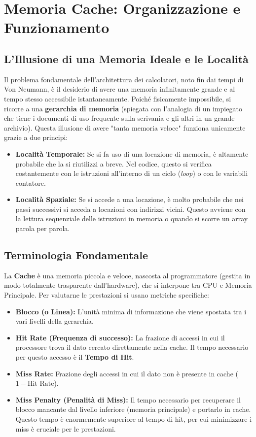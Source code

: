 \documentclass[12pt, a4paper]{article}
\begin{document}
\section{Memoria Cache: Organizzazione e Funzionamento}

\subsection{L'Illusione di una Memoria Ideale e le Località}
Il problema fondamentale dell'architettura dei calcolatori, noto fin dai tempi di Von Neumann, è il desiderio di avere una memoria infinitamente grande e al tempo stesso accessibile istantaneamente. Poiché fisicamente impossibile, si ricorre a una \textbf{gerarchia di memoria} (spiegata con l'analogia di un impiegato che tiene i documenti di uso frequente sulla scrivania e gli altri in un grande archivio).
Questa illusione di avere "tanta memoria veloce" funziona unicamente grazie a due principi:
\begin{itemize}
    \item \textbf{Località Temporale:} Se si fa uso di una locazione di memoria, è altamente probabile che la si riutilizzi a breve. Nel codice, questo si verifica costantemente con le istruzioni all'interno di un ciclo (\textit{loop}) o con le variabili contatore.
    \item \textbf{Località Spaziale:} Se si accede a una locazione, è molto probabile che nei passi successivi si acceda a locazioni con indirizzi vicini. Questo avviene con la lettura sequenziale delle istruzioni in memoria o quando si scorre un array parola per parola.
\end{itemize}

\subsection{Terminologia Fondamentale}
La \textbf{Cache} è una memoria piccola e veloce, nascosta al programmatore (gestita in modo totalmente trasparente dall'hardware), che si interpone tra CPU e Memoria Principale. Per valutarne le prestazioni si usano metriche specifiche:
\begin{itemize}
    \item \textbf{Blocco (o Linea):} L'unità minima di informazione che viene spostata tra i vari livelli della gerarchia.
    \item \textbf{Hit Rate (Frequenza di successo):} La frazione di accessi in cui il processore trova il dato cercato direttamente nella cache. Il tempo necessario per questo accesso è il \textbf{Tempo di Hit}.
    \item \textbf{Miss Rate:} Frazione degli accessi in cui il dato non è presente in cache ($1 - \text{Hit Rate}$).
    \item \textbf{Miss Penalty (Penalità di Miss):} Il tempo necessario per recuperare il blocco mancante dal livello inferiore (memoria principale) e portarlo in cache. Questo tempo è enormemente superiore al tempo di hit, per cui minimizzare i miss è cruciale per le prestazioni.
\end{itemize}
\end{document}
